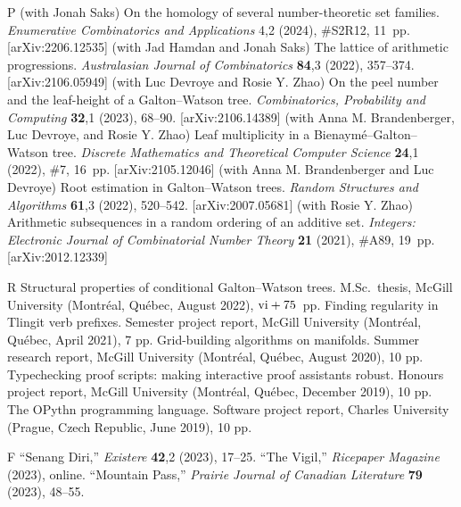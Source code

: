 \begingroup\frenchspacing
{}
\pubbegin P
\papitem (with Jonah Saks)
On the homology of several number-theoretic set families.
{\sl Enumerative Combinatorics and Applications}\/ {4},2 (2024), \#S2R12, 11~pp.
[arXiv:2206.12535]
\papitem (with Jad Hamdan and Jonah Saks)
The lattice of arithmetic progressions.
{\sl Australasian Journal of Combinatorics}\/ {\bf 84},3 (2022), 357--374.
[arXiv:2106.05949]
\papitem (with Luc Devroye and Rosie Y. Zhao)
On the peel number and the leaf-height of a Galton--Watson tree.
{\sl Combinatorics, Probability and Computing}\/ {\bf 32},1 (2023), 68--90.
[arXiv:2106.14389]
\papitem (with Anna M. Brandenberger, Luc Devroye, and Rosie Y. Zhao)
Leaf multiplicity in a Bienaym\'e--Galton--Watson tree. {\sl Discrete Mathematics
and Theoretical Computer Science}\/ {\bf 24},1 (2022), \#7, 16~pp.
[arXiv:2105.12046]
\papitem (with Anna M. Brandenberger and Luc Devroye)
Root estimation in Galton--Watson trees. {\sl Random Structures and Algorithms}\/ {\bf 61},3 (2022), 520--542.
[arXiv:2007.05681]
\papitem (with Rosie Y. Zhao)
Arithmetic subsequences in a random ordering of an additive set.
{\sl Integers: Electronic Journal of Combinatorial Number Theory}\/ {\bf 21} (2021), \#A89, 19~pp.
[arXiv:2012.12339]


\goodbreak
{}

\pubbegin R
\repitem Structural properties of conditional Galton--Watson trees. M.Sc.~thesis, McGill University
(Montr\'eal, Qu\'ebec, August 2022), $\hbox{\rm vi} + 75$~pp.
\repitem Finding regularity in Tlingit verb prefixes. Semester project report, McGill University
(Montr\'eal, Qu\'ebec, April 2021), 7 pp.
\repitem Grid-building algorithms on manifolds. Summer research report, McGill University (Montr\'eal, Qu\'ebec,
August 2020), 10 pp.
\repitem Typechecking proof scripts: making interactive proof assistants robust.
Honours project report, McGill University (Montr\'eal, Qu\'ebec, December 2019), 10 pp.
\repitem The OPythn programming language. Software project report, Charles University (Prague,
Czech Republic, June 2019), 10 pp.

\goodbreak


\pubbegin F
\ficitem ``Senang Diri,'' {\sl Existere} {\bf 42},2 (2023), 17--25.
\ficitem ``The Vigil,'' {\sl Ricepaper Magazine} (2023), online.
\ficitem ``Mountain Pass,'' {\sl Prairie Journal of Canadian Literature} {\bf 79} (2023), 48--55.
\endgroup%

